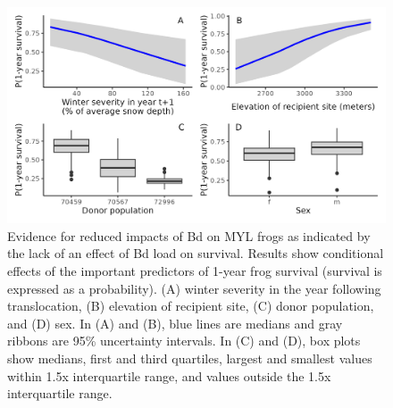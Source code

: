 \documentclass[9pt,twocolumn,twoside,lineno]{pnas-new}
\begin{document}
\begin{figure}

{\centering \includegraphics[width=\textwidth]{figures/cond_effects_plot.png}

}

\caption{\label{fig-cond-effects}Evidence for reduced impacts of Bd on
MYL frogs as indicated by the lack of an effect of Bd load on survival.
Results show conditional effects of the important predictors of 1-year
frog survival (survival is expressed as a probability). (A) winter
severity in the year following translocation, (B) elevation of recipient
site, (C) donor population, and (D) sex. In (A) and (B), blue lines are
medians and gray ribbons are 95\% uncertainty intervals. In (C) and (D),
box plots show medians, first and third quartiles, largest and smallest
values within 1.5x interquartile range, and values outside the 1.5x
interquartile range.}

\end{figure}

\newpage
\end{document}
